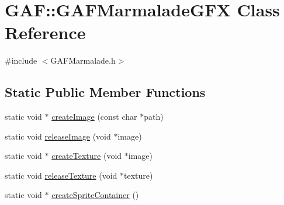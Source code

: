 \hypertarget{class_g_a_f_1_1_g_a_f_marmalade_g_f_x}{\section{G\-A\-F\-:\-:G\-A\-F\-Marmalade\-G\-F\-X Class Reference}
\label{class_g_a_f_1_1_g_a_f_marmalade_g_f_x}
}


{\ttfamily \#include $<$G\-A\-F\-Marmalade.\-h$>$}

\subsection*{Static Public Member Functions}
\begin{DoxyCompactItemize}
\item 
static void $\ast$ \hyperlink{class_g_a_f_1_1_g_a_f_marmalade_g_f_x_a3cf51925d3bcba812aa68d6f795776e8}{create\-Image} (const char $\ast$path)
\item 
static void \hyperlink{class_g_a_f_1_1_g_a_f_marmalade_g_f_x_a9170f1540e2d6672d76f18ed405f74e3}{release\-Image} (void $\ast$image)
\item 
static void $\ast$ \hyperlink{class_g_a_f_1_1_g_a_f_marmalade_g_f_x_a39395671c1920c67a28e5b0d83ade354}{create\-Texture} (void $\ast$image)
\item 
static void \hyperlink{class_g_a_f_1_1_g_a_f_marmalade_g_f_x_a1816b3f6a535721350373376256cb634}{release\-Texture} (void $\ast$texture)
\item 
\hypertarget{class_g_a_f_1_1_g_a_f_marmalade_g_f_x_a51f213df0e537a5994f89f66f93d8cbc}{static void $\ast$ \hyperlink{class_g_a_f_1_1_g_a_f_marmalade_g_f_x_a51f213df0e537a5994f89f66f93d8cbc}{create\-Sprite\-Container} ()}\label{class_g_a_f_1_1_g_a_f_marmalade_g_f_x_a51f213df0e537a5994f89f66f93d8cbc}


\end{DoxyCompactItemize}
